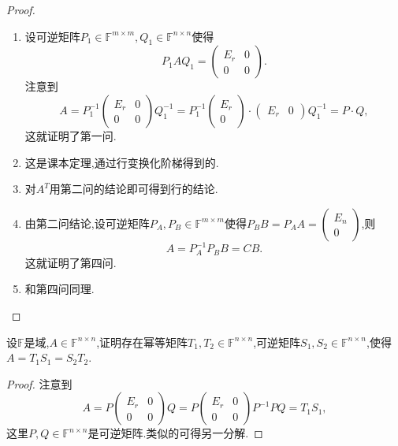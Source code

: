 \documentclass[../../main.tex]{subfiles}%
\begin{document}
\begin{proof}
\begin{enumerate}
\item 设可逆矩阵\( P_1 \in \mathbb{F}^{m \times m}, Q_1 \in \mathbb{F}^{n \times n} \)使得
\[
P_1 A Q_1 = \begin{pmatrix} E_r & 0 \\ 0 & 0 \end{pmatrix}.
\]
注意到
\[
A = P_1^{-1} \begin{pmatrix} E_r & 0 \\ 0 & 0 \end{pmatrix} Q_1^{-1} = P_1^{-1} \begin{pmatrix} E_r \\ 0 \end{pmatrix} \cdot \begin{pmatrix} E_r & 0 \end{pmatrix} Q_1^{-1} = P \cdot Q,
\]
这就证明了第一问.

\item 这是课本定理,通过行变换化阶梯得到的.

\item 对\( A^T \)用第二问的结论即可得到行的结论.

\item 由第二问结论,设可逆矩阵\( P_A, P_B \in \mathbb{F}^{m \times m} \)使得\( P_B B = P_A A = \begin{pmatrix} E_n \\ 0 \end{pmatrix} \),则
\[
A = P_A^{-1} P_B B = CB.
\]
这就证明了第四问.

\item 和第四问同理.
\end{enumerate}

\end{proof}

\begin{theorem}[幂等分解]\label{theorem:幂等分解}
设\( \mathbb{F} \)是域,\( A \in \mathbb{F}^{n \times n} \),证明存在幂等矩阵\( T_1, T_2 \in \mathbb{F}^{n \times n} \),可逆矩阵\( S_1, S_2 \in \mathbb{F}^{n \times n} \),使得\( A = T_1 S_1 = S_2 T_2 \).
\end{theorem}
\begin{proof}

注意到
\[
A = P \begin{pmatrix} E_r & 0 \\ 0 & 0 \end{pmatrix} Q = P \begin{pmatrix} E_r & 0 \\ 0 & 0 \end{pmatrix} P^{-1} PQ = T_1 S_1,
\]
这里\( P, Q \in \mathbb{F}^{n \times n} \)是可逆矩阵.类似的可得另一分解.

\end{proof}
\end{document}
